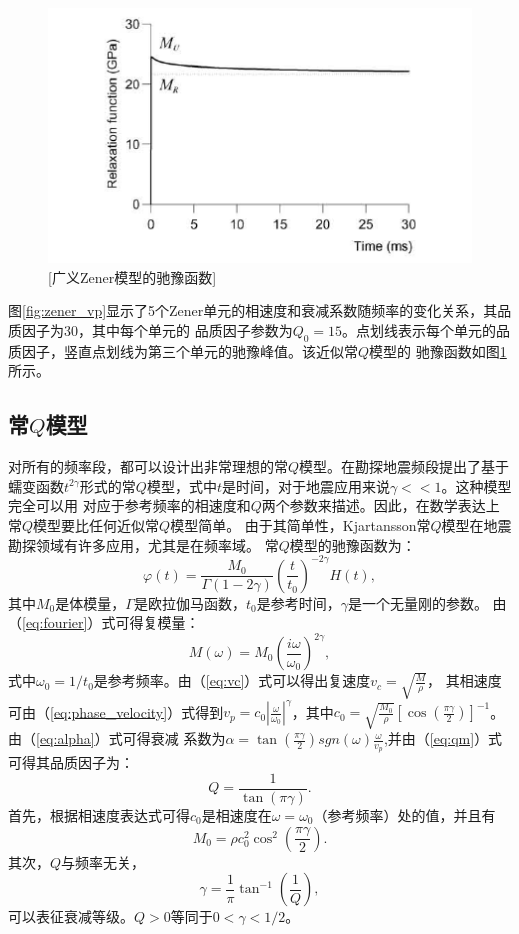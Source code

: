 \begin{figure}[!htbp]
	    \centering
		\includegraphics[width=0.7\linewidth]{figure/zener_rela}
		[广义Zener模型的驰豫函数]
		\label{fig:zener_rela}
\end{figure}
图\ref{fig:zener_vp}显示了5个Zener单元的相速度和衰减系数随频率的变化关系，其品质因子为30，其中每个单元的
品质因子参数为$Q_0=15$。点划线表示每个单元的品质因子，竖直点划线为第三个单元的驰豫峰值。该近似常$Q$模型的
驰豫函数如图\ref{fig:zener_rela}所示。


\vspace{0.5cm}
\subsection{常$Q$模型}
\vspace{0.5cm}
对所有的频率段，都可以设计出非常理想的常$Q$模型。在勘探地震频段提出了基于
蠕变函数$t^{2\gamma}$形式的常$Q$模型，式中$t$是时间，对于地震应用来说$\gamma<<1$。这种模型完全可以用
对应于参考频率的相速度和$Q$两个参数来描述。因此，在数学表达上常$Q$模型要比任何近似常$Q$模型简单。
由于其简单性，Kjartansson常$Q$模型在地震勘探领域有许多应用，尤其是在频率域。
常$Q$模型的驰豫函数为：
\begin{equation}
	\varphi(t)=\frac{M_0}{\Gamma(1-2\gamma)}(\frac{t}{t_0})^{-2\gamma}H(t),
\end{equation}
其中$M_0$是体模量，$\Gamma$是欧拉伽马函数，$t_0$是参考时间，$\gamma$是一个无量刚的参数。
由（\ref{eq:fourier}）式可得复模量：
\begin{equation}
	M(\omega)=M_0(\frac{i\omega}{\omega_0})^{2\gamma},
\end{equation}
式中$\omega_0=1/t_0$是参考频率。由（\ref{eq:vc}）式可以得出复速度$v_c=\sqrt{\frac{M}{\rho}}$，
其相速度可由（\ref{eq:phase_velocity}）式得到$v_p=c_0|\frac{\omega}{\omega_0}|^\gamma$，其中$c_0=
\sqrt{\frac{M_0}{\rho}}[\cos(\frac{\pi\gamma}{2})]^{-1}$。由（\ref{eq:alpha}）式可得衰减
系数为$\alpha=\tan(\frac{\pi\gamma}{2})sgn(\omega)\frac{\omega}{v_p}$,并由（\ref{eq:qm}）式
可得其品质因子为：
\begin{equation}
	Q=\frac{1}{\tan(\pi\gamma)}.
\end{equation}
首先，根据相速度表达式可得$c_0$是相速度在$\omega=\omega_0$（参考频率）处的值，并且有
\begin{equation}
	M_0=\rho c_0^2\cos^2(\frac{\pi\gamma}{2}).
\end{equation}
其次，$Q$与频率无关，
\begin{equation}
	\gamma=\frac{1}{\pi}\tan^{-1}(\frac{1}{Q}),
\end{equation}
可以表征衰减等级。$Q>0$等同于$0<\gamma<1/2$。

